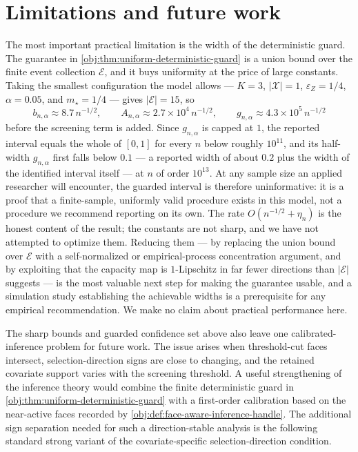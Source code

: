 \section{Limitations and future work}\label{sec:limitations}

The most important practical limitation is the width of the deterministic guard.  The
guarantee in \cref{obj:thm:uniform-deterministic-guard} is a union bound over the finite event
collection \(\mathcal E\), and it buys uniformity at the price of large constants.  Taking the
smallest configuration the model allows --- \(K=3\), \(|\mathcal X|=1\), \(\varepsilon_Z=1/4\),
\(\alpha=0.05\), and \(m_\star=1/4\) --- gives \(|\mathcal E|=15\), so
\[
b_{n,\alpha}\approx 8.7\,n^{-1/2},
\qquad
A_{n,\alpha}\approx 2.7\times10^{4}\,n^{-1/2},
\qquad
g_{n,\alpha}\approx 4.3\times10^{5}\,n^{-1/2}
\]
before the screening term is added.  Since \(g_{n,\alpha}\) is capped at \(1\), the reported
interval equals the whole of \([0,1]\) for every \(n\) below roughly \(10^{11}\), and its
half-width \(g_{n,\alpha}\) first falls below \(0.1\) --- a reported width of about \(0.2\) plus the
width of the identified interval itself --- at \(n\) of order \(10^{13}\).  At any sample size an applied researcher will
encounter, the guarded interval is therefore uninformative: it is a proof that a finite-sample,
uniformly valid procedure exists in this model, not a procedure we recommend reporting on its own.
The rate \(O(n^{-1/2}+\eta_n)\) is the honest content of the result; the constants are not sharp,
and we have not attempted to optimize them.  Reducing them --- by replacing the union bound over
\(\mathcal E\) with a self-normalized or empirical-process concentration argument, and by exploiting
that the capacity map is \(1\)-Lipschitz in far fewer directions than \(|\mathcal E|\) suggests ---
is the most valuable next step for making the guarantee usable, and a simulation study establishing
the achievable widths is a prerequisite for any empirical recommendation.  We make no claim about
practical performance here.

The sharp bounds and guarded confidence set above also leave one calibrated-inference problem for
future work.  The issue arises when threshold-cut faces intersect, selection-direction signs are close to changing, and the retained covariate support varies with the screening threshold.  A useful strengthening of the inference theory would combine the finite deterministic guard in \cref{obj:thm:uniform-deterministic-guard} with a first-order calibration based on the near-active faces recorded by \cref{obj:def:face-aware-inference-handle}.  The additional sign separation needed for such a direction-stable analysis is the following standard strong variant of the covariate-specific selection-direction condition.

